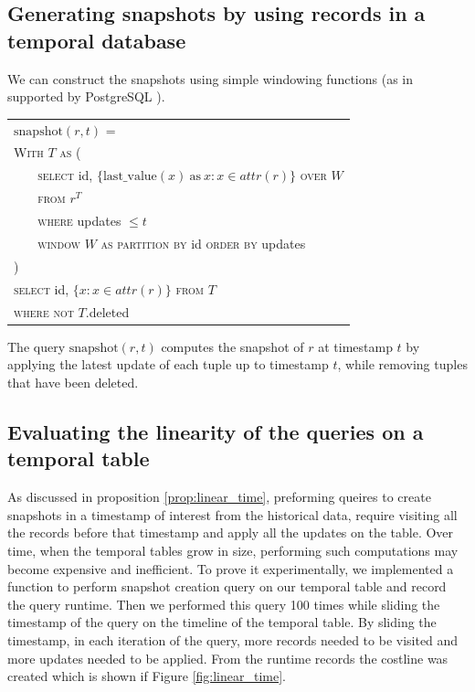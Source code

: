 		\subsection {Generating snapshots by using records in a temporal database} \label{sec:snapshot_generation}
			We can construct the snapshots using simple windowing functions (as in supported by PostgreSQL \cite{momjian2001postgresql}).
    		\vspace{1em}
			\begin{center}
				\begin{table}[b]
					\centering
					\small
						\begin{tabular}{|l|} \hline
							$\mathrm{snapshot}(r, t)$ = \\
							\verb|| \textsc{With} $T$ \textsc{as} ( \\
							\verb|   | \textsc{select} id, $\{\mathrm{last\_value}(x) \mathrm{\ as\ } x:
							x\in attr(r)\}$ \textsc{over} $W$ \\
							\verb|   | \textsc{from} $r^T$ \\
							\verb|   | \textsc{where} updates $\leq t$ \\
							\verb|   | \textsc{window} $W$ \textsc{as} 
							\textsc{partition by} id \textsc{order by} updates\\
							\verb|| ) \\
							\verb|| \textsc{select} id, $\{x: x\in attr(r)\}$ \textsc{from} $T$ \\
							\verb|| \textsc{where not} $T.$deleted \\ \hline
						\end{tabular}
					
				\end{table}
			\end{center}
			The query $\mathrm{snapshot}(r, t)$ computes the snapshot of $r$ at timestamp $t$ by applying the latest update of each tuple up to timestamp $t$, while removing tuples that have been deleted.

		\subsection{Evaluating the linearity of the queries on a temporal table} \label{sec:evaluating_linearity}
			As discussed in proposition \ref{prop:linear_time}, preforming queires to create snapshots in a timestamp of interest from the historical data, require visiting all the records before that timestamp and apply all the updates on the table. Over time, when the temporal tables grow in size, performing such computations may become expensive and inefficient. To prove it experimentally, we implemented a function to perform snapshot creation query on our temporal table and record the query runtime. Then we performed this query 100 times while sliding the timestamp of the query on the timeline of the temporal table. By sliding the timestamp, in each iteration of the query, more records needed to be visited and more updates needed to be applied. From the runtime records the costline was created which is shown if Figure \ref{fig:linear_time}. 

